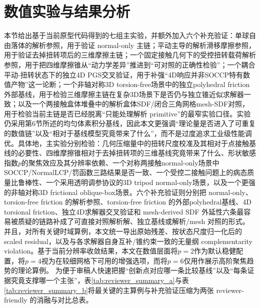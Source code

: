 ﻿\documentclass[12pt, a4paper]{ctexart}
\theoremstyle{plain}
\theoremstyle{remark}
\begin{document}
\section{数值实验与结果分析}
本节给出基于当前原型代码得到的七组主实验，并额外加入六个补充验证：单球自由落体的解析参照，用于验证 normal-only 主链；平动主导的解析滑移摩擦参照，用于验证去掉扭转项后的三维摩擦主链；一个固定接触几何下的受控扭转载荷解析参照，用于把四维摩擦锥从``动力学差异''推进到``可对照的正确性检验''；一个耦合平动-扭转状态下的独立4D PGS交叉验证，用于补强``4D响应并非SOCCP特有数值产物''这一论断；一个非轴对称3D torsion-free场景中的独立polyhedral friction外部基线，用于检验三维摩擦主链在复杂3D场景下是否仍与独立锥近似求解器一致；以及一个两接触盒体堆叠中的解析盒体SDF/闭合三角网格mesh-SDF对照，用于检验当前主链是否已经脱离``只能处理解析 primitive''的最窄实验口径。实验仍采用第6节所述的均匀体素积分基线，因此本文更强调``理论量是否进入了可重复的数值链''以及``相对于基线模型究竟带来了什么''，而不是过度追求工业级性能调优。具体地，主实验分别检验：几何压缩量中的扭转尺度校准及其相对于点接触基线的必要性、四维摩擦锥相对于去掉扭转项的三维基线究竟带来了什么、形状敏感指数$p$的聚焦效应及其分辨率依赖、一个对称两接触normal-only场景中SOCCP/NormalLCP/罚函数三路结果是否一致、一个受控二接触问题上的病态质量比鲁棒性、一个采用透明调参协议的3D tripod normal-only场景，以及一个更强的非轴对称3D frictional oblique-box场景。六个补充验证则分别把 normal-only、torsion-free friction 的解析参照、torsion-free friction 的外部polyhedral基线、4D torsional friction、独立4D求解器交叉验证和 mesh-derived SDF 外延性六条最容易被质疑的链路补成了可直接对照解析解、独立基线或解析/mesh 对照的形式。并且，对所有关键时域算例，本文统一导出原始残差、按状态尺度归一化后的scaled residual，以及与各求解器自身互补/锥约束一致的无量纲 complementarity violation。基于当前分辨率收敛结果，本文在数值层面将$p=2$作为默认稳健配置，将$p=4$视为在较细网格下可用的增强选项，而将$p=6$仅用作展示高阶聚焦趋势的理论算例。
为便于审稿人快速把握``创新点对应哪一条比较基线''以及``每条证据究竟支撑哪一个主张''，表\ref{tab:reviewer_summary_a}与表\ref{tab:reviewer_summary_b}将最关键的主算例与补充验证压缩为两张 reviewer-friendly 的消融与对比总表。
\end{document}
